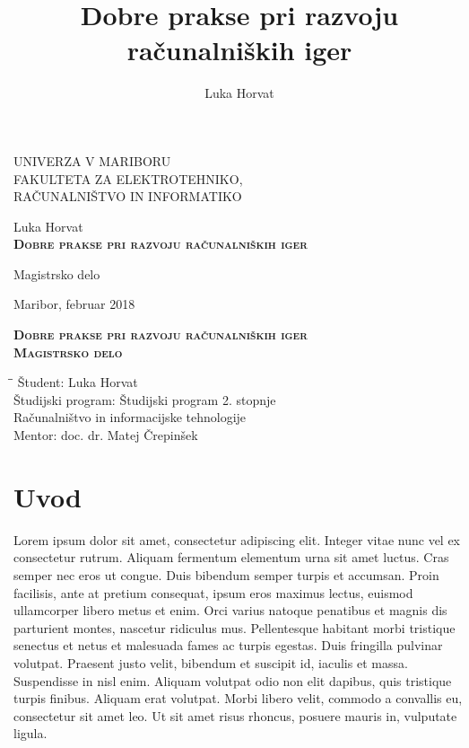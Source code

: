 \documentclass[12pt,a4paper,twoside]{book}
\author{Luka Horvat}
\title{Dobre prakse pri razvoju računalniških iger}
\begin{document}
	
\thispagestyle{empty} 

\begin{center}
{\large 
	UNIVERZA V MARIBORU\\
	FAKULTETA ZA ELEKTROTEHNIKO,\\
	RAČUNALNIŠTVO IN INFORMATIKO\\
}

\vspace{8cm}
{\LARGE Luka Horvat}\\

\vspace{1cm}
\textsc{\textbf{\LARGE
		Dobre prakse pri razvoju računalniških iger}}

\vspace{1cm}
{\LARGE Magistrsko delo}

\vfill
{\Large Maribor, februar 2018}
\newpage
\end{center}

\begin{center}	
\vspace*{\fill}
\textsc{\textbf{\LARGE
		Dobre prakse pri razvoju računalniških iger\\
		Magistrsko delo\\
	}}

\vspace{\fill}
\begin{tabbing}
\hspace*{4cm}\=\hspace*{3cm}\= \kill
Študent: \> Luka Horvat\\
Študijski program: \> Študijski program 2. stopnje\\
\>Računalništvo in informacijske tehnologije\\
Mentor: \> doc. dr. Matej Črepinšek
\end{tabbing}
\newpage

\end{center}

\tableofcontents
\newpage

\chapter{Uvod}
Lorem ipsum dolor sit amet, consectetur adipiscing elit. Integer vitae nunc vel ex consectetur rutrum. Aliquam fermentum elementum urna sit amet luctus. Cras semper nec eros ut congue. Duis bibendum semper turpis et accumsan. Proin facilisis, ante at pretium consequat, ipsum eros maximus lectus, euismod ullamcorper libero metus et enim. Orci varius natoque penatibus et magnis dis parturient montes, nascetur ridiculus mus. Pellentesque habitant morbi tristique senectus et netus et malesuada fames ac turpis egestas. Duis fringilla pulvinar volutpat. Praesent justo velit, bibendum et suscipit id, iaculis et massa. Suspendisse in nisl enim. Aliquam volutpat odio non elit dapibus, quis tristique turpis finibus. Aliquam erat volutpat. Morbi libero velit, commodo a convallis eu, consectetur sit amet leo. Ut sit amet risus rhoncus, posuere mauris in, vulputate ligula.
\end{document}
